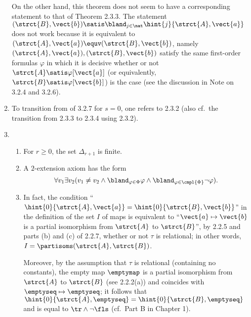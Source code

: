 \begin{enumerate}[1.]
On the other hand, this theorem does not seem to have a corresponding statement  to that of Theorem 2.3.3. The statement $(\strct{B}, \vect{b}) \satis \bland_{j \in \nat} \hint{j}{\strct{A}, \vect{a}}$ does not work because it is equivalent to $(\strct{A}, \vect{a}) \equv (\strct{B}, \vect{b})$, namely $(\strct{A}, \vect{a}), (\strct{B}, \vect{b})$ satisfy the same first-order formulas $\varphi$ in which it is decisive whether or not $\strct{A} \satis \varphi[\vect{a}]$ (or equivalently, $\strct{B} \satis \varphi[\vect{b}]$) is the case (see the discussion in Note on 3.2.4 and 3.2.6).
%
\item {} To transition from  of 3.2.7 for $s = 0$, one refers to 2.3.2 (also cf.\ the transition from 2.3.3 to 2.3.4 using 2.3.2).
%
\item {}
\begin{enumerate}[(1)]
\item For $r \geq 0$, the set $\Delta_{r + 1}$ is finite.
\item A $2$-extension axiom has the form
\[
\forall v_1 \exists v_2 (v_1 \neq v_2 \land \bland_{\varphi \in \Phi} \varphi \land \bland_{\varphi \in \cmpl{\Phi}} \neg\varphi).
\]
\item In fact, the condition ``$\hint{0}{\strct{A}, \vect{a}} = \hint{0}{\strct{B}, \vect{b}}$'' in the definition of the set $I$ of maps is equivalent to ``$\vect{a} \mapsto \vect{b}$ is a partial isomorphism from $\strct{A}$ to $\strct{B}$'', by 2.2.5 and parts (b) and (c) of 2.2.7, whether or not $\tau$ is relational; in other words, $I = \partisoms(\strct{A}, \strct{B})$.

Moreover, by the assumption that $\tau$ is relational (containing no constants), the empty map $\emptymap$ is a partial isomorphism from $\strct{A}$ to $\strct{B}$ (see 2.2.2(a)) and coincides with $\emptyseq \mapsto \emptyseq$; it follows that $\hint{0}{\strct{A}, \emptyseq} = \hint{0}{\strct{B}, \emptyseq}$ and is equal to $\tr \land \neg\fls$ (cf.\ Part B in Chapter 1).


\end{enumerate}
\end{enumerate}
